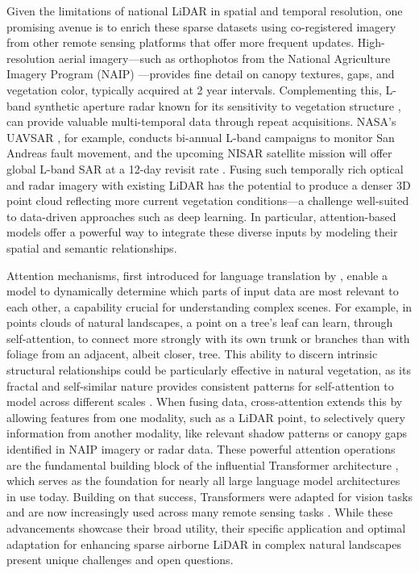 \documentclass[preprint,12pt,authoryear]{elsarticle}
\begin{document}
Given the limitations of national LiDAR in spatial and temporal resolution, one promising avenue is to enrich these sparse datasets using co-registered imagery from other remote sensing platforms that offer more frequent updates. High-resolution aerial imagery—such as orthophotos from the National Agriculture Imagery Program (NAIP) \citep{usda_naip_2024}—provides fine detail on canopy textures, gaps, and vegetation color, typically acquired at 2 year intervals. Complementing this, L-band synthetic aperture radar known for its sensitivity to vegetation structure \citep{wang2025interpretable}, can provide valuable multi-temporal data through repeat acquisitions. NASA’s UAVSAR \citep{rosen2006uavsar}, for example, conducts bi-annual L-band campaigns to monitor San Andreas fault movement, and the upcoming NISAR satellite mission will offer global L-band SAR at a 12-day revisit rate \citep{kellogg2020nasa}. Fusing such temporally rich optical and radar imagery with existing LiDAR has the potential to produce a denser 3D point cloud reflecting more current vegetation conditions—a challenge well-suited to data-driven approaches such as deep learning. In particular, attention-based models offer a powerful way to integrate these diverse inputs by modeling their spatial and semantic relationships.

Attention mechanisms, first introduced for language translation by \citep{bahdanau2014neural}, enable a model to dynamically determine which parts of input data are most relevant to each other, a capability crucial for understanding complex scenes. For example, in points clouds of natural landscapes, a point on a tree’s leaf can learn, through self-attention, to connect more strongly with its own trunk or branches than with foliage from an adjacent, albeit closer, tree. This ability to discern intrinsic structural relationships could be particularly effective in natural vegetation, as its fractal and self-similar nature provides consistent patterns for self-attention to model across different scales \citep{scheuring1994application, yang2015extraction}. When fusing data, cross-attention extends this by allowing features from one modality, such as a LiDAR point, to selectively query information from another modality, like relevant shadow patterns or canopy gaps identified in NAIP imagery or radar data. These powerful attention operations are the fundamental building block of the influential Transformer architecture \citep{vaswani2017attention}, which serves as the foundation for nearly all large language model architectures in use today. Building on that success, Transformers were adapted for vision tasks \citep{dosovitskiy2020image} and are now increasingly used across many remote sensing tasks \citep{aleissaee2023transformers}. While these advancements showcase their broad utility, their specific application and optimal adaptation for enhancing sparse airborne LiDAR in complex natural landscapes present unique challenges and open questions.
\end{document}
